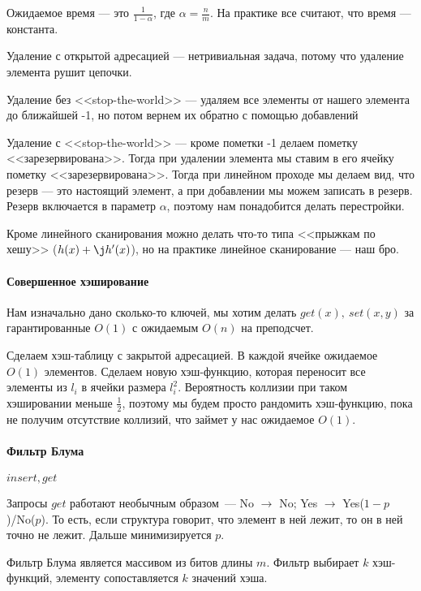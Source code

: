 \documentclass[12pt]{article}
\begin{document}
Ожидаемое время --- это $\frac{1}{1 - \alpha}$, где $\alpha = \frac{n}{m}$. На практике все считают, что время --- константа.

Удаление с открытой адресацией --- нетривиальная задача, потому что удаление элемента рушит цепочки. 

Удаление без <<stop-the-world>> --- удаляем все элементы от нашего элемента до ближайшей -1, но потом вернем их обратно с помощью добавлений

Удаление с <<stop-the-world>> --- кроме пометки -1 делаем пометку <<зарезервирована>>. Тогда при удалении элемента мы ставим в его ячейку пометку <<зарезервирована>>. Тогда при линейном проходе мы делаем вид, что резерв --- это настоящий элемент, а при добавлении мы можем записать в резерв. Резерв включается в параметр $\alpha$, поэтому нам понадобится делать перестройки.

Кроме линейного сканирования можно делать что-то типа <<прыжкам по хешу>> ($h(x) + \j h'(x)$), но на практике линейное сканирование --- наш бро.

\paragraph{Совершенное хэширование}
\hspace{\fill}

Нам изначально дано сколько-то ключей, мы хотим делать $get(x),\ set(x, y)$ за гарантированные $O(1)$ с ожидаемым $O(n)$ на преподсчет.

Сделаем хэш-таблицу с закрытой адресацией. В каждой ячейке ожидаемое $O(1)$ элементов. Сделаем новую хэш-функцию, которая переносит все элементы из $l_i$ в ячейки размера $l_i^2$. Вероятность коллизии при таком хэшировании меньше $\frac{1}{2}$, поэтому мы будем просто рандомить хэш-функцию, пока не получим отсутствие коллизий, что займет у нас ожидаемое $O(1)$.

\paragraph{Фильтр Блума}
\hspace{\fill}

$insert, get$

Запросы $get$ работают необычным образом~--- No $\rightarrow$ No; Yes $\rightarrow$ Yes($1-p$)/No($p$). То есть, если структура говорит, что элемент в ней лежит, то он в ней точно не лежит. Дальше минимизируется $p$.

Фильтр Блума является массивом из битов длины $m$. Фильтр выбирает $k$ хэш-функций, элементу сопоставляется $k$ значений хэша. 
\end{document}
